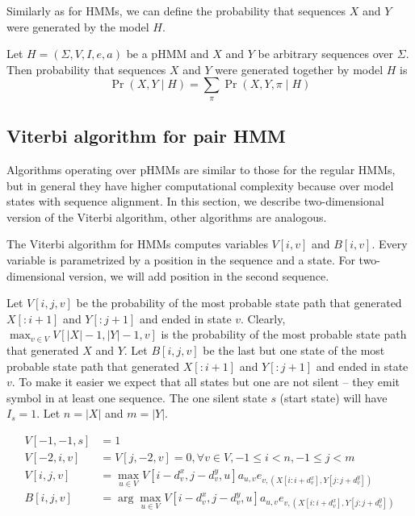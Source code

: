 Similarly as for HMMs, we can define the probability that sequences $X$ and $Y$ were
generated by the model $H$.

\begin{definition}
Let $H=(\Sigma,V,I,e,a)$ be a pHMM and  $X$ and $Y$ be arbitrary sequences over
$\Sigma$. Then probability that sequences $X$ and $Y$ were generated together by
model $H$ is 
\begin{equation}
\Pr\left(X,Y\mid H\right)=\sum_{\pi}\Pr\left(X,Y,\pi\mid H\right)
\end{equation}
\end{definition}


\subsection{Viterbi algorithm for pair HMM}
\label{SECTION:PAIRHMMVITERBI}
Algorithms operating over pHMMs are similar to those for the regular HMMs, but in
general they have higher computational complexity because over model states with
sequence alignment.
In this section, we describe two-dimensional version of the Viterbi algorithm,
other algorithms are analogous.

The Viterbi algorithm for HMMs computes variables $V[i,v]$ and $B[i,v]$. Every
variable is parametrized by a position in the sequence and a state. For
two-dimensional version, we will add position in the second sequence.

Let $V[i,j,v]$ be the probability of the most probable state path that generated
$X[:i+1]$ and $Y[:j+1]$ and ended in state $v$. Clearly, $\max_{v\in
V}V[|X|-1,|Y|-1,v]$ is the probability of the most probable state path that
generated $X$ and $Y$. Let $B[i,j,v]$ be the last but one state of the most
probable state path that generated $X[:i+1]$ and $Y[:j+1]$ and ended in state
$v$. To make it easier we expect that all states but one are not silent -- they emit
symbol in at least one sequence. The one silent state $s$ (start state) will have $I_s=1$.
 Let $n=|X|$ and $m=|Y|$.


\begin{align}
V[-1,-1,s] &= 1\\
V[-2,i,v] &= V[j,-2,v] = 0, \forall v\in V,-1 \leq i < n, -1\leq j < m\\
V[i,j,v] &= \max_{u\in
V}V[i-d^x_{v},j-d^y_v,u]a_{u,v}e_{v,(X[i:i+d^x_v],Y[j:j+d^y_v])}\label{EQUATION:2DVITERBIF}\\
B[i,j,v] &= \arg\max_{u\in
V}V[i-d^x_{v},j-d^y_v,u]a_{u,v}e_{v,(X[i:i+d^x_v],Y[j:j+d^y_v])}\label{EQUATION:2DVITERBIB}
\end{align}

